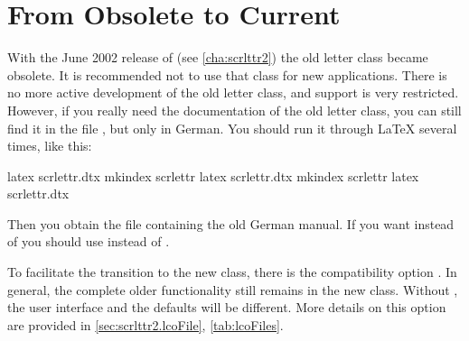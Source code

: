 \section{From Obsolete  to Current }

With the June 2002 release of  (see
\autoref{cha:scrlttr2}) the old letter class  became
obsolete. It is recommended not to use that class for new applications. There
is no more active development of the old letter class, and support is very
restricted. However, if you really need the documentation of the old letter
class, you can still find it in the file , but only in
German. You should run it through {\LaTeX} several times, like this:
\begin{lstoutput}[morekeywords={latex,mkindex}]
  latex scrlettr.dtx
  mkindex scrlettr
  latex scrlettr.dtx
  mkindex scrlettr
  latex scrlettr.dtx
\end{lstoutput}
Then you obtain the file  containing the old German
manual. If you want  instead of  you
should use  instead of .

To facilitate the transition to the new class, there is the compatibility
option . In general, the complete older functionality still
remains in the new class.  Without , the user
interface and the defaults will be different. More details on
this option are provided in \autoref{sec:scrlttr2.lcoFile},
\autoref{tab:lcoFiles}.

%
\EndIndexGroup

\endinput

